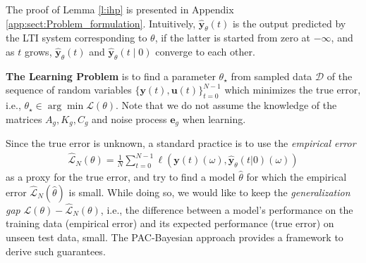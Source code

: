 \documentclass{article}
\newcommand{\train}{\mathcal{D}}
\def\rvu{{\mathbf{i}}}
\def\rvu{{\mathbf{u}}}
\def\rvy{{\mathbf{y}}}
\newcommand{\Ls}{\mathcal{L}}
\newcommand{\e}{\mathbf{e}}
\begin{document}
The proof of Lemma \ref{l:ihp} is presented in Appendix \ref{app:sect:Problem_formulation}. 
Intuitively, $\hat{\rvy}_{\theta}(t)$
is the output predicted by the LTI system corresponding to
$\theta$, if the latter is started from zero at $-\infty$, and as $t$ grows, $\hat{\rvy}_{\theta}(t)$
and $\hat{\rvy}_{\theta}(t \mid 0)$ converge to each other.

\textbf{The Learning Problem} is to 
find a parameter $\theta_{\star}$  from sampled data $\train$ of the sequence of random variables $\{\rvy(t),\rvu(t)\}_{t=0}^{N-1}$ which minimizes the true error, i.e., $\theta_{\star}\in\arg\min \mathcal{L}(\theta)$.
Note that we do not assume the knowledge of the matrices $A_g,K_g,C_g$ and noise process $\e_g$ when learning. %

Since the true error is unknown, a standard practice is to use the \emph{empirical error} 
\begin{align}
    \hat{\mathcal{L}}_N(\theta)=\frac{1}{N}\sum_{t=0}^{N-1}\ell(\rvy(t)(\omega),\hat{\rvy}_\theta(t|0)(\omega))
\end{align}
as a proxy for the true error, and try to find a 
model $\hat{\theta}$ for which the empirical error 
$\hat{\mathcal{L}}_N(\hat{\theta})$ is small. 
While doing so, we would like to keep the \emph{generalization gap} $\mathcal{L}(\theta)-\hat{\Ls}_N(\theta)$, i.e., the difference between a model's performance on the training data (empirical error) and its expected performance (true error) on unseen test data, small.  The PAC-Bayesian approach provides a framework to derive such guarantees.
\end{document}
